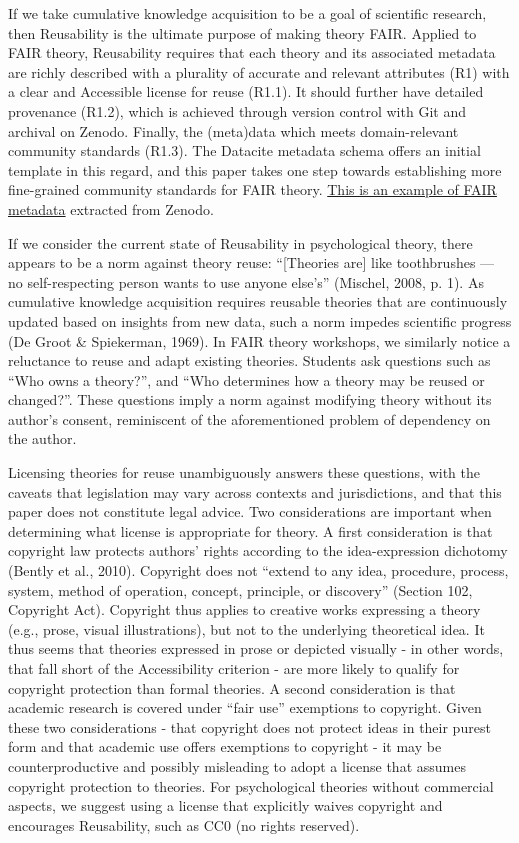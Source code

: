\documentclass[
  man, noextraspace,floatsintext]{apa7}
\begin{document}
If we take cumulative knowledge acquisition to be a goal of scientific research, then Reusability is the ultimate purpose of making theory FAIR.
Applied to FAIR theory, Reusability requires that each theory and its associated metadata are richly described with a plurality of accurate and relevant attributes (R1) with a clear and Accessible license for reuse (R1.1).
It should further have detailed provenance (R1.2),
which is achieved through version control with Git and archival on Zenodo.
Finally, the (meta)data which meets domain-relevant community standards (R1.3).
The Datacite metadata schema offers an initial template in this regard,
and this paper takes one step towards establishing more fine-grained community standards for FAIR theory.
\href{https://github.com/cjvanlissa/fair_theory/blob/3b4894da576cb76d19e911a05dd513d5172058ec/example_metadata.json}{This is an example of FAIR metadata} extracted from Zenodo.

If we consider the current state of Reusability in psychological theory, there appears to be a norm against theory reuse:
``{[}Theories are{]} like toothbrushes --- no self-respecting person wants to use anyone else's'' (Mischel, 2008, p. 1).
As cumulative knowledge acquisition requires reusable theories that are continuously updated based on insights from new data, such a norm impedes scientific progress (De Groot \& Spiekerman, 1969).
In FAIR theory workshops, we similarly notice a reluctance to reuse and adapt existing theories.
Students ask questions such as ``Who owns a theory?'',
and ``Who determines how a theory may be reused or changed?''.
These questions imply a norm against modifying theory without its author's consent, reminiscent of the aforementioned problem of dependency on the author.

Licensing theories for reuse unambiguously answers these questions,
with the caveats that legislation may vary across contexts and jurisdictions, and that this paper does not constitute legal advice.
Two considerations are important when determining what license is appropriate for theory.
A first consideration is that copyright law protects authors' rights according to the idea-expression dichotomy (Bently et al., 2010).
Copyright does not
``extend to any idea, procedure, process, system, method of operation, concept, principle, or discovery'' (Section 102, Copyright Act).
Copyright thus applies to creative works expressing a theory (e.g., prose, visual illustrations),
but not to the underlying theoretical idea.
It thus seems that theories expressed in prose or depicted visually - in other words, that fall short of the Accessibility criterion - are more likely to qualify for copyright protection than formal theories.
A second consideration is that academic research is covered under ``fair use'' exemptions to copyright.
Given these two considerations - that copyright does not protect ideas in their purest form and that academic use offers exemptions to copyright - it may be counterproductive and possibly misleading to adopt a license that assumes copyright protection to theories.
For psychological theories without commercial aspects, we suggest using a license that explicitly waives copyright and encourages Reusability,
such as CC0 (no rights reserved).
\end{document}

